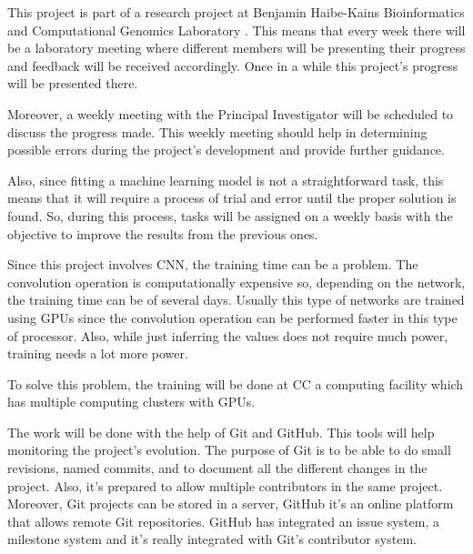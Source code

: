 
This project is part of a research project at Benjamin Haibe-Kains Bioinformatics and 
Computational Genomics Laboratory \cite{bhklab}. This means that every week there will be a 
laboratory meeting where different members will be presenting their progress and feedback will
be received accordingly. Once in a while this project's progress will be presented there.

Moreover, a weekly meeting with the Principal Investigator will be scheduled to discuss
the progress made. This weekly meeting should help in determining possible errors during the 
project's development and provide further guidance.

Also, since fitting a machine learning model is not a straightforward task, this means that 
it will require a process of trial and error until the proper solution is found. 
So, during this process, tasks will be assigned on a weekly basis with the objective to
improve the results from the previous ones.



Since this project involves \gls{CNN}, the training time can be a problem. 
The convolution operation is computationally expensive so, depending on the network, the 
training time can be of several days. Usually this type of networks are trained using 
GPUs since the convolution operation can be performed faster in this type of processor. 
Also, while just inferring the values does not require
much power, training needs a lot more power. 

To solve this problem, the training will be done at \gls{CC} a computing facility which 
has multiple computing clusters with GPUs.


The work will be done with the help of Git and GitHub. This tools will help monitoring
the project's evolution. The purpose of Git is to be able to do small revisions,
named commits, and to document all the different changes in the project. Also, it's 
prepared to allow multiple contributors in the same project. Moreover,
Git projects can be stored in a server, GitHub it's an online platform that allows
remote Git repositories. GitHub has integrated an issue system, a milestone system
and it's really integrated with Git's contributor system.
~\cites{tool:git}{tool:github}


